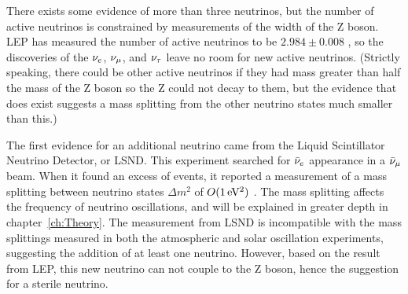 There exists some evidence of more than three neutrinos, but the number of active neutrinos is constrained by measurements of the width of the Z boson. LEP has measured the number of active neutrinos to be $2.984 \pm 0.008$ \cite{ref:LEP}, so the discoveries of the $\nu_{e}$, $\nu_{\mu}$, and $\nu_{\tau}$ leave no room for new active neutrinos. (Strictly speaking, there could be other active neutrinos if they had mass greater than half the mass of the Z boson so the Z could not decay to them, but the evidence that does exist suggests a mass splitting from the other neutrino states much smaller than this.)

The first evidence for an additional neutrino came from the Liquid Scintillator Neutrino Detector, or LSND. This experiment searched for $\bar{\nu}_{e}$ appearance in a $\bar{\nu}_{\mu}$ beam. When it found an excess of events, it reported a measurement of a mass splitting between neutrino states $\Delta m^2$ of $O(1\mbox{\,eV\textsuperscript{2}})$ \cite{ref:LSND}. The mass splitting affects the frequency of neutrino oscillations, and will be explained in greater depth in chapter~\ref{ch:Theory}. The measurement from LSND is incompatible with the mass splittings measured in both the atmospheric and solar oscillation experiments, suggesting the addition of at least one neutrino. However, based on the result from LEP, this new neutrino can not couple to the Z boson, hence the suggestion for a sterile neutrino.




